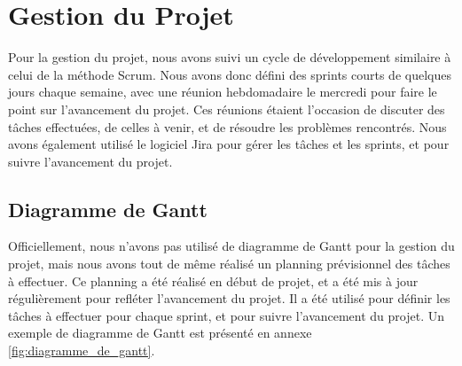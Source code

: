 \section{Gestion du Projet}

Pour la gestion du projet, nous avons suivi un cycle de développement similaire à celui de la méthode Scrum. 
Nous avons donc défini des sprints courts de quelques jours chaque semaine, avec une réunion hebdomadaire
le mercredi pour faire le point sur l'avancement du projet. 
Ces réunions étaient l'occasion de discuter des tâches effectuées, de celles à venir, et de résoudre les problèmes rencontrés.
Nous avons également utilisé le logiciel Jira pour gérer les tâches et les sprints, et pour suivre l'avancement du projet.

\subsection{Diagramme de Gantt}
Officiellement, nous n'avons pas utilisé de diagramme de Gantt pour la gestion du projet, mais nous avons tout de même
réalisé un planning prévisionnel des tâches à effectuer.
Ce planning a été réalisé en début de projet, et a été mis à jour régulièrement pour refléter l'avancement du projet.
Il a été utilisé pour définir les tâches à effectuer pour chaque sprint, et pour suivre l'avancement du projet.
Un exemple de diagramme de Gantt est présenté en annexe \ref{fig:diagramme_de_gantt}.


